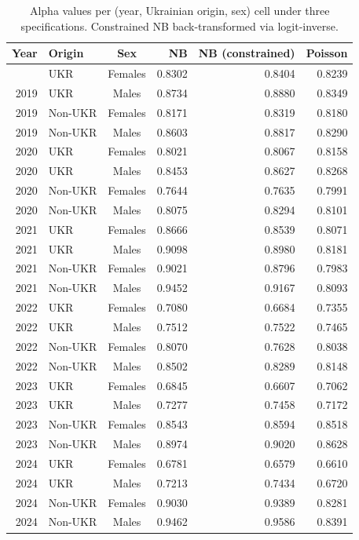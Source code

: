 \begin{table}[ht!]
\caption{\label{tbl-alpha-cells}Alpha values per (year, Ukrainian origin, sex) cell under three specifications. Constrained NB back-transformed via logit-inverse.} 
\fontsize{8.0pt}{10.0pt}\selectfont
\begin{tabular*}{\linewidth}{@{\extracolsep{\fill}}rlcrrr}
\toprule
Year & Origin & Sex & NB & NB (constrained) & Poisson \\ 
\midrule\addlinespace[2.5pt]
2019 & UKR & Females & 0.8302 & 0.8404 & 0.8239 \\ 
2019 & UKR & Males & 0.8734 & 0.8880 & 0.8349 \\ 
2019 & Non-UKR & Females & 0.8171 & 0.8319 & 0.8180 \\ 
2019 & Non-UKR & Males & 0.8603 & 0.8817 & 0.8290 \\ 
2020 & UKR & Females & 0.8021 & 0.8067 & 0.8158 \\ 
2020 & UKR & Males & 0.8453 & 0.8627 & 0.8268 \\ 
2020 & Non-UKR & Females & 0.7644 & 0.7635 & 0.7991 \\ 
2020 & Non-UKR & Males & 0.8075 & 0.8294 & 0.8101 \\ 
2021 & UKR & Females & 0.8666 & 0.8539 & 0.8071 \\ 
2021 & UKR & Males & 0.9098 & 0.8980 & 0.8181 \\ 
2021 & Non-UKR & Females & 0.9021 & 0.8796 & 0.7983 \\ 
2021 & Non-UKR & Males & 0.9452 & 0.9167 & 0.8093 \\ 
2022 & UKR & Females & 0.7080 & 0.6684 & 0.7355 \\ 
2022 & UKR & Males & 0.7512 & 0.7522 & 0.7465 \\ 
2022 & Non-UKR & Females & 0.8070 & 0.7628 & 0.8038 \\ 
2022 & Non-UKR & Males & 0.8502 & 0.8289 & 0.8148 \\ 
2023 & UKR & Females & 0.6845 & 0.6607 & 0.7062 \\ 
2023 & UKR & Males & 0.7277 & 0.7458 & 0.7172 \\ 
2023 & Non-UKR & Females & 0.8543 & 0.8594 & 0.8518 \\ 
2023 & Non-UKR & Males & 0.8974 & 0.9020 & 0.8628 \\ 
2024 & UKR & Females & 0.6781 & 0.6579 & 0.6610 \\ 
2024 & UKR & Males & 0.7213 & 0.7434 & 0.6720 \\ 
2024 & Non-UKR & Females & 0.9030 & 0.9389 & 0.8281 \\ 
2024 & Non-UKR & Males & 0.9462 & 0.9586 & 0.8391 \\ 
\bottomrule
\end{tabular*}
\end{table}




